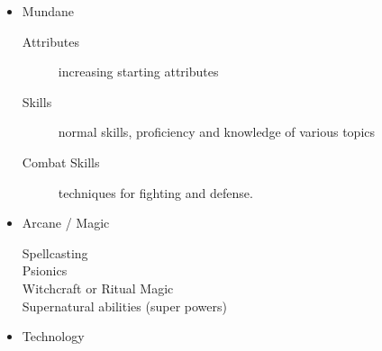 \documentclass[twoside]{book}
\begin{document}
\begin{itemize}
      
  \item   
                
    {  
    Mundane 
                  
\begin{description}
    
  \item[ Attributes ] 
    {  
     increasing starting attributes 
    }
  
  \item[ Skills ] 
    {  
     normal skills, proficiency and knowledge
                         of various topics 
    }
  
  \item[ Combat Skills ] 
    {  
     techniques for fighting and defense.
                         
    }
  
\end{description}
    
                
    }
    
              
  \item   
                
    {  
    Arcane / Magic 
                  
\begin{description}
    
  \item[ Spellcasting ] 
    {  
    
    }
  
  \item[ Psionics ] 
    {  
    
    }
  
  \item[ Witchcraft or Ritual Magic
                       ] 
    {  
    
    }
  
  \item[ Supernatural abilities (super powers)
                       ] 
    {  
    
    }
  
\end{description}
  
                
    }
    
              
  \item   
                
    {  
    Technology 
                  
}
\end{itemize}
\end{document}
